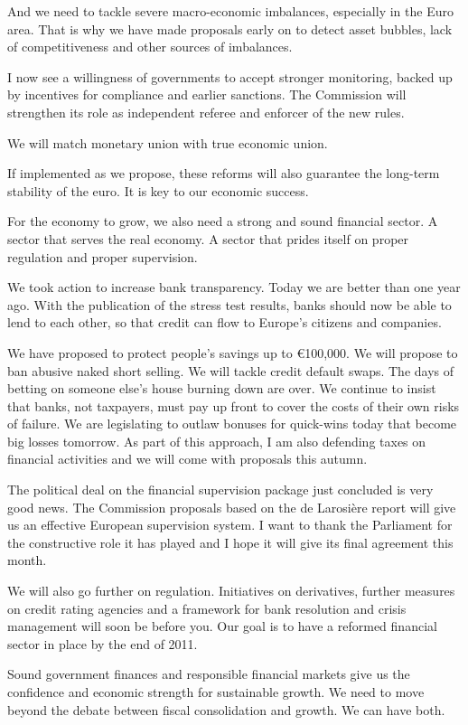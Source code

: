 \documentclass[a4paper,11pt]{article}
\begin{document}
And we need to tackle severe macro-economic imbalances, especially in the Euro area. That is why we have made proposals early on to detect asset bubbles, lack of competitiveness and other sources of imbalances.

I now see a willingness of governments to accept stronger monitoring, backed up by incentives for compliance and earlier sanctions. The Commission will strengthen its role as independent referee and enforcer of the new rules.

We will match monetary union with true economic union.

If implemented as we propose, these reforms will also guarantee the long-term stability of the euro. It is key to our economic success.

For the economy to grow, we also need a strong and sound financial sector. A sector that serves the real economy. A sector that prides itself on proper regulation and proper supervision.

We took action to increase bank transparency. Today we are better than one year ago. With the publication of the stress test results, banks should now be able to lend to each other, so that credit can flow to Europe's citizens and companies.

We have proposed to protect people's savings up to \euro100,000. We will propose to ban abusive naked short selling. We will tackle credit default swaps. The days of betting on someone else's house burning down are over. We continue to insist that banks, not taxpayers, must pay up front to cover the costs of their own risks of failure. We are legislating to outlaw bonuses for quick-wins today that become big losses tomorrow. As part of this approach, I am also defending taxes on financial activities and we will come with proposals this autumn.

The political deal on the financial supervision package just concluded is very good news. The Commission proposals based on the de Larosière report will give us an effective European supervision system. I want to thank the Parliament for the constructive role it has played and I hope it will give its final agreement this month.

We will also go further on regulation. Initiatives on derivatives, further measures on credit rating agencies and a framework for bank resolution and crisis management will soon be before you. Our goal is to have a reformed financial sector in place by the end of 2011.

Sound government finances and responsible financial markets give us the confidence and economic strength for sustainable growth. We need to move beyond the debate between fiscal consolidation and growth. We can have both.
\end{document}
